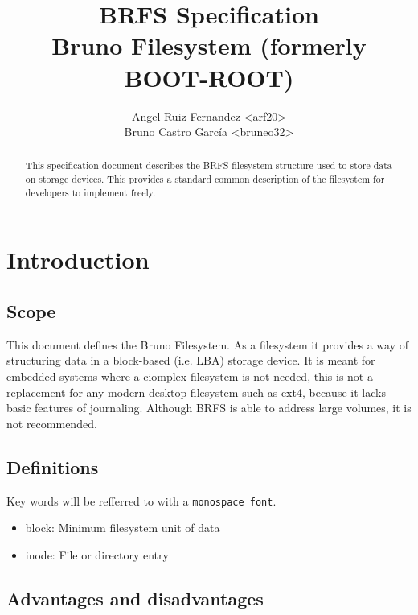 \documentclass[]{article}
\title{
	\textbf{BRFS Specification} \\
	\large Bruno Filesystem (formerly BOOT-ROOT)
}
\author{
	Angel Ruiz Fernandez \textless arf20\textgreater \\
	Bruno Castro García  \textless bruneo32\textgreater
}
\begin{document}
	\maketitle
	\thispagestyle{fancy}
	
	\begin{abstract}
		This specification document describes the BRFS filesystem structure used to store data on storage devices. This provides a standard common description of the filesystem for developers to implement freely.
	\end{abstract}

	\begin{versionhistory}
	\end{versionhistory}

	\pagebreak
	
	\tableofcontents
	\pagebreak
	
	\section{Introduction}
	\subsection{Scope}
	
	This document defines the Bruno Filesystem. As a filesystem it provides a way of structuring data in a block-based (i.e. LBA) storage device. It is meant for embedded systems where a ciomplex filesystem is not needed, this is not a replacement for any modern desktop filesystem such as ext4, because it lacks basic features of journaling. Although BRFS is able to address large volumes, it is not recommended.
	
	\subsection{Definitions}
	
	Key words will be refferred to with a \texttt{monospace font}.
	
	\begin{itemize}
		\item block: Minimum filesystem unit of data
		\item inode: File or directory entry
	\end{itemize}
	
	\subsection{Advantages and disadvantages}
	
\end{document}
